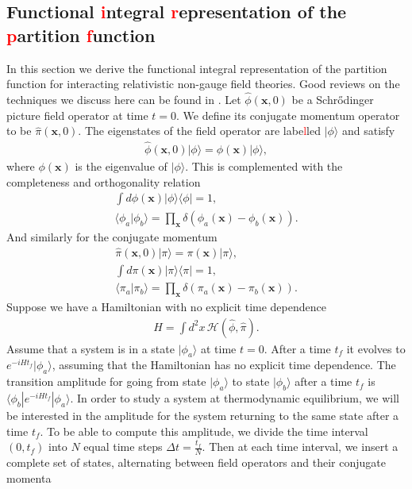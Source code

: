         \subsection{Functional \textcolor{red}{i}ntegral \textcolor{red}{r}epresentation of the \textcolor{red}{p}artition \textcolor{red}{f}unction}
        In this section we derive the functional integral representation of the partition function for interacting relativistic non-gauge field theories. Good reviews on the techniques we discuss here can be found in \cite{Laine:2016hma, 0486477223}.
        Let $\hat{\phi}(\bm{x},0)$ be a Schr{\H o}dinger picture field operator at time $t=0$. We define its conjugate momentum operator to be $\hat{\pi}(\bm{x},0)$. The eigenstates of the field operator are labe\textcolor{red}{l}led $| \phi \rangle$ and satisfy
        \begin{align}
            \hat{\phi}(\bm{x},0) | \phi \rangle = \phi(\bm{x}) | \phi \rangle,
        \end{align}
        where $\phi(\bm{x})$ is the eigenvalue of $| \phi \rangle$. This is complemented with the completeness and orthogonality relation
        \begin{align}
            \int d \phi(\bm{x}) | \phi \rangle \langle \phi | = 1, \\
            \langle \phi_a | \phi_b \rangle = \prod_{\bm{x}} \delta(\phi_a(\bm{x}) - \phi_b(\bm{x})).
        \end{align}
        And similarly for the conjugate momentum
        \begin{align}
            \hat{\pi}(\bm{x},0) | \pi \rangle = \pi(\bm{x}) | \pi \rangle, \\
            \int d \pi(\bm{x}) | \pi \rangle \langle \pi | = 1, \\
            \langle \pi_a | \pi_b \rangle = \prod_{\bm{x}} \delta(\pi_a(\bm{x}) - \pi_b(\bm{x})).
        \end{align}
        Suppose we have a Hamiltonian with no explicit time dependence
        \begin{align}
            H = \int d^2x \, \mathcal{H}(\hat{\phi}, \hat{\pi}).
        \end{align}
        Assume that a system is in a state $| \phi_a \rangle$ at time $t=0$. After a time $t_f$ it evolves to $e^{-i H t_f} | \phi_a \rangle$, assuming that the Hamiltonian has no explicit time dependence. The transition amplitude for going from state $| \phi_a \rangle$ to state $| \phi_b \rangle$ after a time $t_f$ is $\langle \phi_b | e^{-i H t_f} | \phi_a \rangle$. In order to study a system at thermodynamic equilibrium, we will be interested in the amplitude for the system returning to the same state after a time $t_f$. To be able to compute this amplitude, we divide the time interval $(0, t_f)$ into $N$ equal time steps $\Delta t = \frac{t_f}{N}$. Then at each time interval, we insert a complete set of states, alternating between field operators and their conjugate momenta


